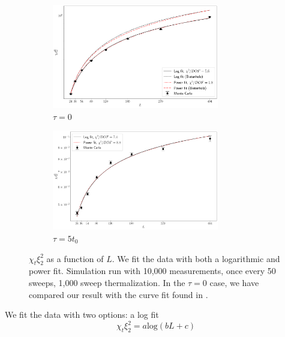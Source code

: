 \begin{figure}[h!]
    \begin{center}
      \begin{subfigure}[b]{\textwidth}
          \centering
          \includegraphics[width=0.8\textwidth]{imgs/divergence.png}
          \caption{$\tau = 0$}
      \end{subfigure}

      \begin{subfigure}[b]{\textwidth}
          \centering
          \includegraphics[width=0.8\textwidth]{imgs/divergence_flowed.png}
          \caption{$\tau = 5t_0$}
      \end{subfigure}
      \caption{\label{fig:divergence} $\chi_t\xi_2^2$ as a function of $L$. We fit the data with both a logarithmic and power fit. Simulation run with 10,000 measurements, once every 50 sweeps, 1,000 sweep thermalization. In the $\tau=0$ case, we have compared our result with the curve fit found in \cite{bietenholz2018}.}
    \end{center}
\end{figure}
We fit the data with two options: a log fit
\begin{equation}
    \chi_t \xi_2^2 = a \mathrm{log}(b L + c)
\end{equation}
